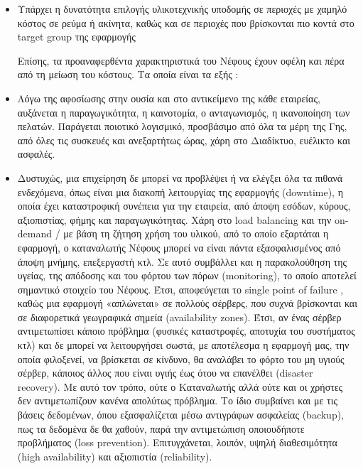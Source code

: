 \documentclass{article}
\begin{document}
\begin{itemize}
\item	Υπάρχει η δυνατότητα επιλογής υλικοτεχνικής υποδομής σε περιοχές με χαμηλό κόστος σε ρεύμα ή ακίνητα, καθώς και σε περιοχές που βρίσκονται πιο κοντά στο target group της εφαρμογής


Επίσης, τα προαναφερθέντα χαρακτηριστικά του Νέφους έχουν οφέλη και πέρα από τη μείωση του κόστους. Τα οποία είναι τα εξής :
\item	Λόγω της αφοσίωσης στην ουσία και στο αντικείμενο της κάθε εταιρείας, αυξάνεται η παραγωγικότητα, η καινοτομία, ο ανταγωνισμός, η ικανοποίηση των πελατών. Παράγεται ποιοτικό λογισμικό, προσβάσιμο από όλα τα μέρη της Γης, από όλες τις συσκευές και ανεξαρτήτως ώρας, χάρη στο Διαδίκτυο, ευέλικτο και ασφαλές.

\item	Δυστυχώς, μια επιχείρηση δε μπορεί να προβλέψει ή να ελέγξει όλα τα πιθανά ενδεχόμενα, όπως είναι μια διακοπή λειτουργίας της εφαρμογής (downtime), η οποία έχει καταστροφική συνέπεια για την εταιρεία, από άποψη εσόδων, κύρους, αξιοπιστίας, φήμης και παραγωγικότητας. Χάρη στο load balancing και την on-demand / με βάση τη ζήτηση χρήση του υλικού, από το οποίο εξαρτάται η εφαρμογή, ο καταναλωτής Νέφους μπορεί να είναι πάντα εξασφαλισμένος από άποψη μνήμης, επεξεργαστή κτλ. Σε αυτό συμβάλλει και η παρακολούθηση της υγείας, της απόδοσης και του φόρτου των πόρων (monitoring), το οποίο αποτελεί σημαντικό στοιχείο του Νέφους. Έτσι, αποφεύγεται το single point of failure , καθώς μια εφαρμογή «απλώνεται» σε πολλούς σέρβερς, που συχνά βρίσκονται και σε διαφορετικά γεωγραφικά σημεία (availability zones). Έτσι, αν ένας σέρβερ αντιμετωπίσει κάποιο πρόβλημα (φυσικές καταστροφές, αποτυχία του συστήματος κτλ) και δε μπορεί να λειτουργήσει σωστά, με αποτέλεσμα η εφαρμογή μας, την οποία φιλοξενεί, να βρίσκεται σε κίνδυνο, θα αναλάβει το φόρτο του μη υγιούς σέρβερ, κάποιος άλλος που είναι υγιής έως ότου να επανέλθει (disaster recovery). Με αυτό τον τρόπο, ούτε ο Καταναλωτής αλλά ούτε και οι χρήστες δεν αντιμετωπίζουν κανένα απολύτως πρόβλημα. Το ίδιο συμβαίνει και με τις βάσεις δεδομένων, όπου εξασφαλίζεται μέσω αντιγράφων ασφαλείας (backup), πως τα δεδομένα δε θα χαθούν, παρά την αντιμετώπιση οποιουδήποτε προβλήματος (loss prevention). Επιτυγχάνεται, λοιπόν, υψηλή διαθεσιμότητα (high availability) και αξιοπιστία (reliability).


\end{itemize}
\end{document}
